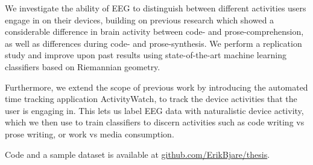 We investigate the ability of EEG to distinguish between different activities users engage in on their devices, building on previous research which showed a considerable difference in brain activity between code- and prose-comprehension, as well as differences during code- and prose-synthesis. We perform a replication study and improve upon past results using state-of-the-art machine learning classifiers based on Riemannian geometry.

Furthermore, we extend the scope of previous work by introducing the automated time tracking application ActivityWatch, to track the device activities that the user is engaging in. This lets us label EEG data with naturalistic device activity, which we then use to train classifiers to discern activities such as code writing vs prose writing, or work vs media consumption.

Code and a sample dataset is available at \href{https://github.com/ErikBjare/thesis}{github.com/ErikBjare/thesis}.
